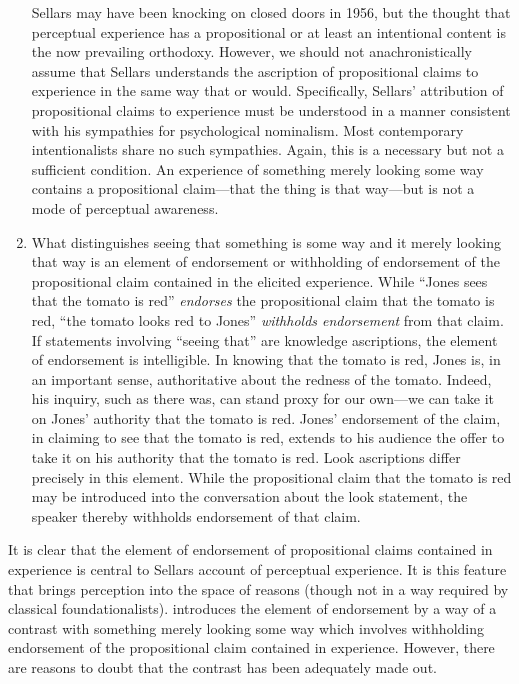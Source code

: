 \documentclass[12pt]{article}
\begin{document}
\begin{enumerate}
    Sellars may have been knocking on closed doors in 1956, but the thought that perceptual experience has a propositional or at least an intentional content is the now prevailing orthodoxy. However, we should not anachronistically assume that Sellars understands the ascription of propositional claims to experience in the same way that \citet[]{Harman:1990lm} or \citet[]{Tye:2000vn} would. Specifically, Sellars' attribution of propositional claims to experience must be understood in a manner consistent with his sympathies for psychological nominalism. Most contemporary intentionalists share no such sympathies. Again, this is a necessary but not a sufficient condition. An experience of something merely looking some way contains a propositional claim---that the thing is that way---but is not a mode of perceptual awareness.
    \item What distinguishes seeing that something is some way and it merely looking that way is an element of endorsement or withholding of endorsement of the propositional claim contained in the elicited experience. While ``Jones sees that the tomato is red'' \emph{endorses} the propositional claim that the tomato is red, ``the tomato looks red to Jones'' \emph{withholds endorsement} from that claim. If statements involving ``seeing that'' are knowledge ascriptions, the element of endorsement is intelligible. In knowing that the tomato is red, Jones is, in an important sense, authoritative about the redness of the tomato. Indeed, his inquiry, such as there was, can stand proxy for our own---we can take it on Jones' authority that the tomato is red. Jones' endorsement of the claim, in claiming to see that the tomato is red, extends to his audience the offer to take it on his authority that the tomato is red. Look ascriptions differ precisely in this element. While the propositional claim that the tomato is red may be introduced into the conversation about the look statement, the speaker thereby withholds endorsement of that claim. 
\end{enumerate}

It is clear that the element of endorsement of propositional claims contained in experience is central to Sellars account of perceptual experience. It is this feature that brings perception into the space of reasons (though not in a way required by classical foundationalists). \citet[§§16--17]{Sellars:1956xp} introduces the element of endorsement by a way of a contrast with something merely looking some way which involves withholding endorsement of the propositional claim contained in experience. However, there are reasons to doubt that the contrast has been adequately made out.
\end{document}
